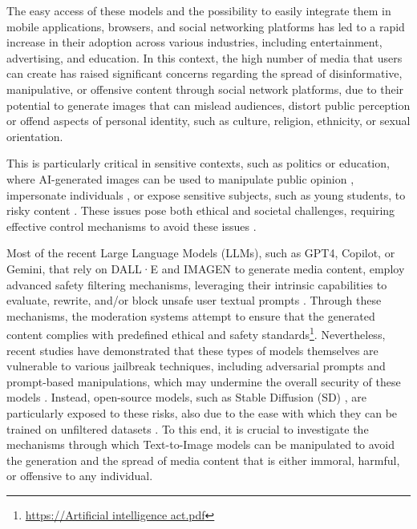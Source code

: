 \documentclass[acmsmall]{acmart}
\newcommand{\dalle}{DALL·E\xspace}
\newcommand{\imagen}{IMAGEN\xspace}
\begin{document}
The easy access of these models and the possibility to easily integrate them in mobile applications, browsers, and social networking platforms has led to a rapid increase in their adoption across various industries, including entertainment, advertising, and education.
In this context, the high number of media that users can create has raised significant concerns regarding the spread of disinformative, manipulative, or offensive content through social network platforms, due to their potential to generate images that can mislead audiences, distort public perception or offend aspects of personal identity, such as culture, religion, ethnicity, or sexual orientation.

This is particularly critical in sensitive contexts, such as politics or education, where AI-generated images can be used to manipulate public opinion \cite{zhang2024toward}, impersonate individuals  \cite{maniyal2024unveiling}, or expose sensitive subjects, such as young students, to risky content \cite{lee2024life}. These issues pose both ethical and societal challenges, requiring effective control mechanisms to avoid these issues \cite{schramowski2023safe}.

Most of the recent Large Language Models (LLMs), such as GPT4, Copilot, or Gemini, that rely on \dalle and \imagen to generate media content, employ advanced safety filtering mechanisms, leveraging their intrinsic capabilities to evaluate, rewrite, and/or block unsafe user textual prompts \cite{ramesh2022hierarchical}. 
Through these mechanisms, the moderation systems attempt to ensure that the generated content complies with predefined ethical and safety standards\footnote{\href{https://www.europarl.europa.eu/RegData/etudes/BRIE/2021/698792/EPRS_BRI(2021)698792_EN.pdf}{https://Artificial intelligence act.pdf}}. Nevertheless, recent studies have demonstrated that these types of models themselves are vulnerable to various jailbreak techniques, including adversarial prompts and prompt-based manipulations, which may undermine the overall security of these models \cite{yang2024mma, yang2023sneakyprompt}. 
Instead, open-source models, such as Stable Diffusion (SD) \cite{stable-diffusion-v1-4}, are particularly exposed to these risks, also due to the ease with which they can be trained on unfiltered datasets \cite{rando2022red,parrish2023adversarial}. To this end, it is crucial to investigate the mechanisms through which Text-to-Image models can be manipulated to avoid the generation and the spread of media content that is either immoral, harmful, or offensive to any individual. 
\end{document}
